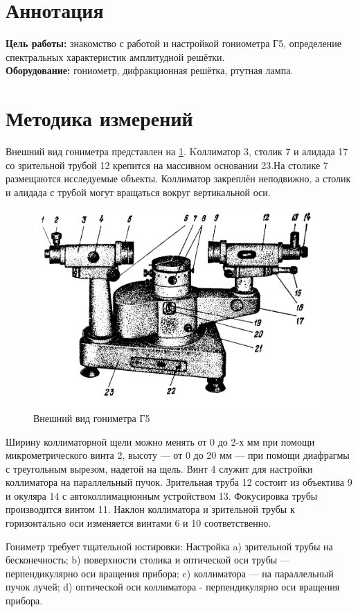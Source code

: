 \section*{Аннотация}
\textbf{Цель работы:} знакомство с работой и настройкой гониометра Г5,
определение спектральных характеристик амплитудной решётки.\\\indent
\textbf{Оборудование:} гониометр, дифракционная решётка, ртутная лампа.

\section*{Методика измерений}
Внешний вид гониметра представлен на \ref{figure:gonimetr}. Kоллиматор 3, столик 7 и алидада 17 со зрительной трубой 12 крепится на
массивном основании 23.На столике 7 размещаются исследуемые объекты.
Коллиматор закреплён неподвижно, а столик и алидада с трубой могут вращаться
вокруг вертикальной оси.
\begin{figure}[h!]
    \centering
    \includegraphics[width=12cm]{images/gonimetr.png}
    \caption{Внешний вид гониметра Г5} \label{figure:gonimetr}
\end{figure}
Ширину коллиматорной щели можно менять от 0 до 2-х мм при помощи
микрометрического винта 2, высоту — от 0 до 20 мм — при помощи диафрагмы с треугольным вырезом, надетой на щель. Винт 4 служит для настройки коллиматора на параллельный пучок.
Зрительная труба 12 состоит из объектива 9 и окуляра 14 с автоколлимационным
устройством 13. Фокусировка трубы производится винтом 11. Наклон коллиматора 
и зрительной трубы к горизонтально оси изменяется винтами 6 и 10 соответственно.

\indent Гониметр требует тщательной юстировки:
Настройка
a) зрительной трубы на бесконечность;
b) поверхности столика и оптической оси трубы — перпендикулярно оси вращения прибора;
c) коллиматора — на параллельный пучок лучей;
d) оптической оси коллиматора - перпендикулярно оси вращения прибора.

